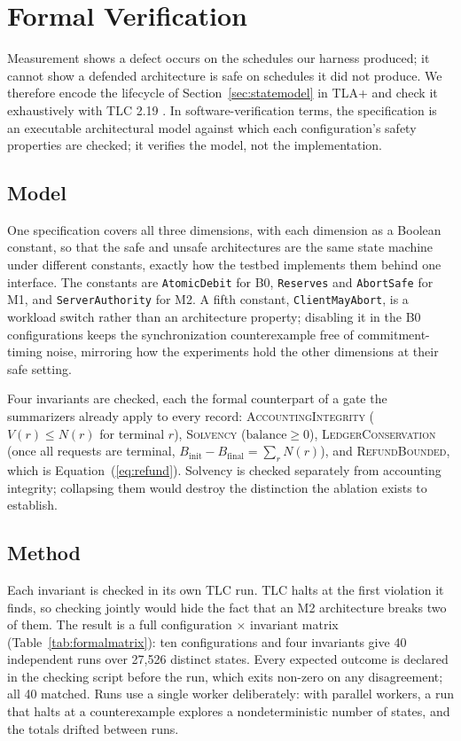 \documentclass[manuscript,review]{acmart}
\begin{document}
\section{Formal Verification}
\label{sec:formal}
Measurement shows a defect occurs on the schedules our harness produced; it cannot show a
defended architecture is safe on schedules it did not produce. We therefore encode the
lifecycle of Section~\ref{sec:statemodel} in TLA+ \citep{tla} and check it exhaustively
with TLC 2.19 \citep{tlc}. In software-verification terms, the specification is an
executable architectural model against which each configuration's safety properties are
checked; it verifies the model, not the implementation.

\subsection{Model}
One specification covers all three dimensions, with each dimension as a Boolean constant,
so that the safe and unsafe architectures are the same state machine under different
constants, exactly how the testbed implements them behind one interface. The constants
are \texttt{AtomicDebit} for B0, \texttt{Reserves} and \texttt{AbortSafe} for M1, and
\texttt{ServerAuthority} for M2. A fifth constant, \texttt{ClientMayAbort}, is a workload
switch rather than an architecture property; disabling it in the B0 configurations keeps
the synchronization counterexample free of commitment-timing noise, mirroring how the
experiments hold the other dimensions at their safe setting.

Four invariants are checked, each the formal counterpart of a gate the summarizers
already apply to every record: \textsc{AccountingIntegrity} ($V(r) \le N(r)$ for terminal
$r$), \textsc{Solvency} ($\mathrm{balance} \ge 0$), \textsc{LedgerConservation} (once all
requests are terminal, $B_{\mathrm{init}} - B_{\mathrm{final}} = \sum_r N(r)$), and
\textsc{RefundBounded}, which is Equation~(\ref{eq:refund}). Solvency is checked
separately from accounting integrity; collapsing them would destroy the distinction the
ablation exists to establish.

\subsection{Method}
Each invariant is checked in its own TLC run. TLC halts at the first violation it finds,
so checking jointly would hide the fact that an M2 architecture breaks two of them. The
result is a full configuration $\times$ invariant matrix (Table~\ref{tab:formalmatrix}):
ten configurations and four invariants give 40 independent runs over 27{,}526 distinct
states. Every expected outcome is declared in the checking script before the run, which exits
non-zero on any disagreement; all 40 matched. Runs
use a single worker deliberately: with parallel workers, a run that halts at a
counterexample explores a nondeterministic number of states, and the totals drifted
between runs.
\end{document}
